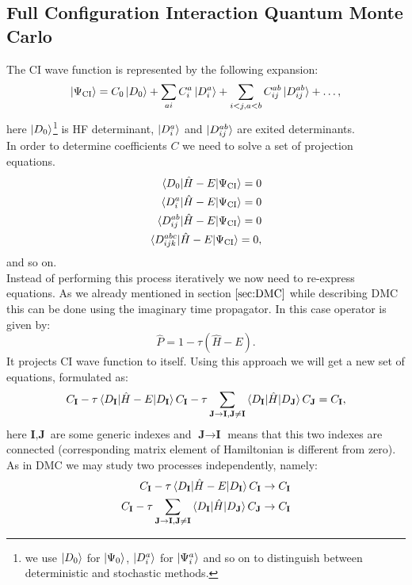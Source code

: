 \documentclass[twoside,english]{uiofysmaster}
\theoremstyle{definition}
\begin{document}
\subsection{Full Configuration Interaction Quantum Monte Carlo} \label{sec:FCIQMC}
The CI wave function is represented by the following expansion:
 \begin{equation}\label{eq:fciqmcWF}
\ket{\Psi_{\text{CI}}}= C_0\ket{D_0} + \sum_{ai} C_i^a \ket{D_i^a} + \sum_{i<j,a<b}C_{ij}^{ab}\ket{D_{ij}^{ab}} + \dots,
 \end{equation}
here $\ket{D_0}$\footnote{we use $\ket{D_0}$ for $\ket{\Psi_0}$, $\ket{D_i^a}$ for $\ket{\Psi_i^a}$ and so on to distinguish between deterministic and stochastic methods.} is HF determinant, $\ket{D_i^a}$ and $\ket{D_{ij}^{ab}}$ are exited determinants.\\
In order to determine coefficients $C$ we need to solve a set of projection equations. 
\begin{align}
\braket{D_0|\hat{H}-E|\Psi_{\text{CI}}}=0\\
\braket{D_i^a|\hat{H}-E|\Psi_{\text{CI}}}=0\\
\braket{D_{ij}^{ab}|\hat{H}-E|\Psi_{\text{CI}}}=0\\
\braket{D_{ijk}^{abc}|\hat{H}-E|\Psi_{\text{CI}}}=0,
\end{align} 
and so on.\\
Instead of performing this process iteratively we now need to re-express equations. As we already mentioned in section $\ref{sec:DMC}$ while describing DMC this can be done using the imaginary time propagator. In this case operator is given by:
\begin{equation}\label{eq:projector} 
\hat{P}=1-\tau(\hat{H}-E).
\end{equation}
It projects CI wave function to itself. Using this approach we will get a new set of equations, formulated as:
\begin{equation}\label{eq:CIprojected}
C_{\textbf{I}} - \tau \braket{D_{\textbf{I}}|\hat{H}-E|D_{\textbf{I}}}C_{\textbf{I}} - \tau \sum_{\textbf{J}\rightarrow \textbf{I},\textbf{J}\neq \textbf{I} }  \braket{D_{\textbf{I}}|\hat{H}|D_{\textbf{J}}}C_{\textbf{J}} = C_{\textbf{I}},
\end{equation}
here $\textbf{I}, \textbf{J}$ are some generic indexes and $\textbf{J}\rightarrow \textbf{I}$ means that this two indexes are connected (corresponding matrix element of Hamiltonian is different from zero).
As in DMC we may study two processes independently, namely:
\begin{align}
C_{\textbf{I}} - \tau \braket{D_{\textbf{I}}|\hat{H}-E|D_{\textbf{I}}}C_{\textbf{I}} \rightarrow C_{\textbf{I}}\\\label{eq:FCIQMC_coef1}
C_{\textbf{I}} - \tau \sum_{\textbf{J}\rightarrow \textbf{I},\textbf{J}\neq \textbf{I} }  \braket{D_{\textbf{I}}|\hat{H}|D_{\textbf{J}}}C_{\textbf{J}} \rightarrow C_{\textbf{I}}\\ \label{eq:FCIQMC_coef2}
\end{align}
\end{document}
